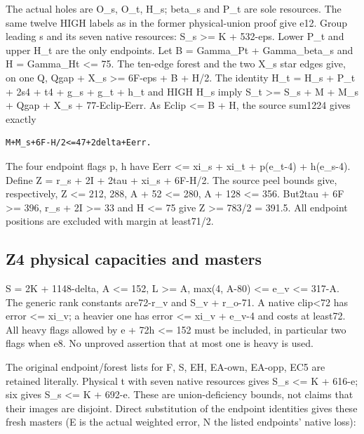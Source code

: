 \documentclass[11pt,a4paper]{article}
\begin{document}
The actual holes are O\_s, O\_t, H\_s; beta\_s and P\_t are sole
resources. The same twelve HIGH labels as in the former physical-union
proof give e12. Group leading s and its seven native resources: S\_s
\textgreater= K + 532-eps. Lower P\_t and upper H\_t are the only
endpoints. Let B = Gamma\_Pt + Gamma\_beta\_s and H = Gamma\_Ht
\textless= 75. The ten-edge forest and the two X\_s star edges give, on
one Q, Qgap + X\_s \textgreater= 6F-eps + B + H/2. The identity H\_t =
H\_s + P\_t + 2s4 + t4 + g\_s + g\_t + h\_t and HIGH H\_s imply S\_t
\textgreater= S\_s + M + M\_s + Qgap + X\_s + 77-Eclip-Eerr. As Eclip
\textless= B + H, the source sum1224 gives exactly

\begin{verbatim}
M+M_s+6F-H/2<=47+2delta+Eerr.
\end{verbatim}

The four endpoint flags p, h have Eerr \textless= xi\_s + xi\_t +
p(e\_t-4) + h(e\_s-4). Define Z = r\_s + 2I + 2tau + xi\_s + 6F-H/2. The
source peel bounds give, respectively, Z \textless= 212, 288, A + 52
\textless= 280, A + 128 \textless= 356. But2tau + 6F \textgreater= 396,
r\_s + 2I \textgreater= 33 and H \textless= 75 give Z \textgreater=
783/2 = 391.5. All endpoint positions are excluded with margin at
least71/2.

\hypertarget{z4-physical-capacities-and-masters}{%
\subsection{Z4 physical capacities and
masters}\label{z4-physical-capacities-and-masters}}

S = 2K + 1148-delta, A \textless= 152, L \textgreater= A, max(4, A-80)
\textless= e\_v \textless= 317-A. The generic rank constants are72-r\_v
and S\_v + r\_o-71. A native clip\textless72 has error \textless= xi\_v;
a heavier one has error \textless= xi\_v + e\_v-4 and costs at least72.
All heavy flags allowed by e + 72h \textless= 152 must be included, in
particular two flags when e8. No unproved assertion that at most one is
heavy is used.

The original endpoint/forest lists for F, S, EH, EA-own, EA-opp, EC5 are
retained literally. Physical t with seven native resources gives S\_s
\textless= K + 616-e; six gives S\_s \textless= K + 692-e. These are
union-deficiency bounds, not claims that their images are disjoint.
Direct substitution of the endpoint identities gives these fresh masters
(E is the actual weighted error, N the listed endpoints' native loss):
\end{document}
